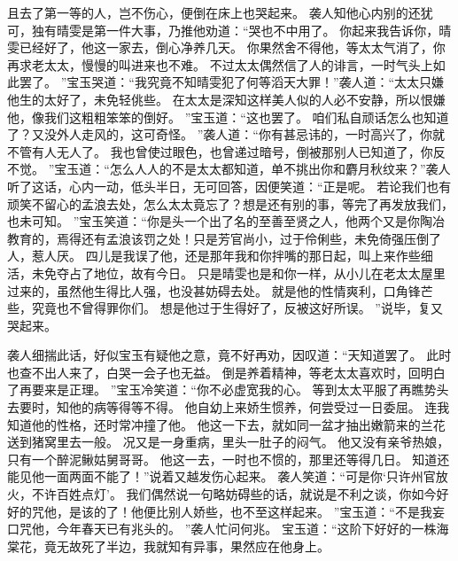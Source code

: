 且去了第一等的人，岂不伤心，便倒在床上也哭起来。
袭人知他心内别的还犹可，独有晴雯是第一件大事，乃推他劝道：“哭也不中用了。
你起来我告诉你，晴雯已经好了，他这一家去，倒心净养几天。
你果然舍不得他，等太太气消了，你再求老太太，慢慢的叫进来也不难。
不过太太偶然信了人的诽言，一时气头上如此罢了。
”宝玉哭道：“我究竟不知晴雯犯了何等滔天大罪！”袭人道：“太太只嫌他生的太好了，未免轻佻些。
在太太是深知这样美人似的人必不安静，所以恨嫌他，像我们这粗粗笨笨的倒好。
”宝玉道：“这也罢了。
咱们私自顽话怎么也知道了？又没外人走风的，这可奇怪。
”袭人道：“你有甚忌讳的，一时高兴了，你就不管有人无人了。
我也曾使过眼色，也曾递过暗号，倒被那别人已知道了，你反不觉。
”宝玉道：“怎么人人的不是太太都知道，单不挑出你和麝月秋纹来？”袭人听了这话，心内一动，低头半日，无可回答，因便笑道：“正是呢。
若论我们也有顽笑不留心的孟浪去处，怎么太太竟忘了？想是还有别的事，等完了再发放我们，也未可知。
”宝玉笑道：“你是头一个出了名的至善至贤之人，他两个又是你陶冶教育的，焉得还有孟浪该罚之处！只是芳官尚小，过于伶俐些，未免倚强压倒了人，惹人厌。
四儿是我误了他，还是那年我和你拌嘴的那日起，叫上来作些细活，未免夺占了地位，故有今日。
只是晴雯也是和你一样，从小儿在老太太屋里过来的，虽然他生得比人强，也没甚妨碍去处。
就是他的性情爽利，口角锋芒些，究竟也不曾得罪你们。
想是他过于生得好了，反被这好所误。
”说毕，复又哭起来。
\par
袭人细揣此话，好似宝玉有疑他之意，竟不好再劝，因叹道：“天知道罢了。
此时也查不出人来了，白哭一会子也无益。
倒是养着精神，等老太太喜欢时，回明白了再要来是正理。
”宝玉冷笑道：“你不必虚宽我的心。
等到太太平服了再瞧势头去要时，知他的病等得等不得。
他自幼上来娇生惯养，何尝受过一日委屈。
连我知道他的性格，还时常冲撞了他。
他这一下去，就如同一盆才抽出嫩箭来的兰花送到猪窝里去一般。
况又是一身重病，里头一肚子的闷气。
他又没有亲爷热娘，只有一个醉泥鳅姑舅哥哥。
他这一去，一时也不惯的，那里还等得几日。
知道还能见他一面两面不能了！”说着又越发伤心起来。
袭人笑道：“可是你‘只许州官放火，不许百姓点灯’。
我们偶然说一句略妨碍些的话，就说是不利之谈，你如今好好的咒他，是该的了！他便比别人娇些，也不至这样起来。
”宝玉道：“不是我妄口咒他，今年春天已有兆头的。
”袭人忙问何兆。
宝玉道：“这阶下好好的一株海棠花，竟无故死了半边，我就知有异事，果然应在他身上。
